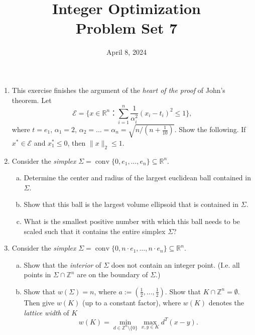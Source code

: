 \documentclass[11pt,a4paper]{article}
\title{Integer Optimization  \\ Problem Set 7 }
\date{ April 8, 2024}
\renewcommand{\leq}{\leqslant}
\DeclareMathOperator{\conv}{conv}
\begin{document}
\maketitle 


\begin{enumerate}



\item This exercise finishes the argument of the \emph{heart of the proof} of John's theorem. Let
  \begin{displaymath}
    ℰ = \{ x ∈ ℝ^n ： ∑_{i=1}^n \frac{1}{α_i^2} (x_i - t_i)^2 ≤ 1\},  
  \end{displaymath}
  where $t = e_1$, $α_1 = 2$, $α_2=\dots=α_n  = \sqrt{n / \left(n+ \frac{1}{10}\right)}$. Show the following. If $x^* ∈ ℰ$ and $x^*_1 ≤0$, then $\|x\|_2 ≤ 1$.  
  

 
\item Consider the \emph{simplex} $Σ = \conv \{0, e_1,\dots,e_n\} ⊆ ℝ^n$.
  \begin{enumerate}[a)] 
  \item Determine the center and radius of the largest euclidean ball contained in $Σ$.
  \item Show that this ball is the largest volume ellipsoid that is contained in $Σ$.
  \item What  is the smallest positive number with which this ball needs to be scaled such that it contains the entire simplex $Σ$? 
  \end{enumerate}
  
  

\item Consider  the \emph{simplex} $Σ = \conv \{0, n⋅e_1,\dots,n⋅e_n\} ⊆ ℝ^n$.
  \begin{enumerate}[a)]
  \item Show that the \emph{interior} of $Σ$ does not contain an integer point. (I.e. all points in $Σ ∩ℤ^n$ are on the boundary of $Σ$.)
  \item Show that $w(Σ) = n$,
    where $a:=\left(\frac{1}{2},\hdots,\frac{1}{2}\right)$. Show that $K∩\mathbb{Z}^n =\emptyset$. Then give $w(K)$ (up to a constant factor), where $w(K)$ denotes the \emph{lattice width} of $K$
  \begin{displaymath}
    w(K) = \min_{d ∈ ℤ^n \setminus \{0\}} \max_{x,y ∈K} d^T(x - y).
  \end{displaymath}
  
 \end{enumerate}
  

\end{enumerate}
\end{document}
